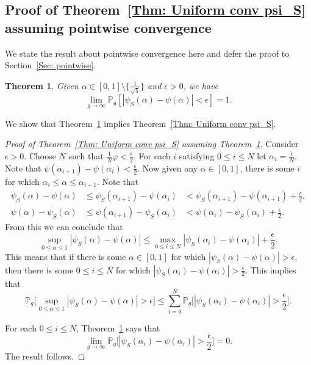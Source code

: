 \documentclass[12pt]{amsart}
\renewcommand{\phi}{\varphi}
\renewcommand{\P}{\mathbb{P}}
\newtheorem{theorem}{Theorem}
\begin{document}
\subsection{Proof of Theorem~\ref{Thm: Uniform conv psi_S} assuming pointwise convergence} 

We state the result about pointwise convergence here and defer the proof to Section~\ref{Sec: pointwise}.

\begin{theorem}\label{Thm: pointwise convergence}
Given $\alpha\in[0,1]\setminus\{\frac{1}{\sqrt{5}}\}$ and $\epsilon>0$, we have
\[\lim_{g\to\infty} \P_g[ |\psi_S(\alpha) -\psi(\alpha)|<\epsilon ] =1.\]
\end{theorem}

We show that Theorem~\ref{Thm: pointwise convergence} implies Theorem~\ref{Thm: Uniform conv psi_S}.

\begin{proof}[Proof of Theorem~\ref{Thm: Uniform conv psi_S} assuming Theorem~\ref{Thm: pointwise convergence}]
Consider $\epsilon>0$.
Choose $N$ such that $\frac{1}{N}\phi <\frac{\epsilon}{2}$. For each $i$ satisfying $0 \le i \le N$ let $\alpha_i=\frac{i}{N}$. Note that $\psi(\alpha_{i+1})-\psi(\alpha_i)<\frac{\epsilon}{2}$.
Now given any $\alpha\in [0,1]$, there is some $i$ for which $\alpha_i\leq \alpha\leq \alpha_{i+1}$. Note that
\begin{eqnarray*}
\psi_S(\alpha)-\psi(\alpha) & \leq \psi_S(\alpha_{i+1})-\psi(\alpha_i) & < \psi_S(\alpha_{i+1})-\psi(\alpha_{i+1}) +\frac{\epsilon}{2},\\
\psi(\alpha)-\psi_S(\alpha) & \leq \psi(\alpha_{i+1})-\psi_S(\alpha_i)  &< \psi(\alpha_{i})-\psi_S(\alpha_{i}) +\frac{\epsilon}{2}.
\end{eqnarray*}
From this we can conclude that
\[\sup_{0\leq \alpha\leq 1} |\psi_S(\alpha)-\psi(\alpha)| \leq \max_{0\leq i\leq N} |\psi_S(\alpha_i)- \psi(\alpha_i)| +\frac{\epsilon}{2}.\]
This means that if there is some $\alpha\in[0,1]$ for which $|\psi_S(\alpha)-\psi(\alpha)|>\epsilon$, then there is some $0\leq i\leq N$ for which $|\psi_S(\alpha_i)-\psi(\alpha_i)|>\frac{\epsilon}{2}$. This implies that
\[\P_g\Big[ \sup_{0\leq \alpha\leq 1}|\psi_S(\alpha) -\psi(\alpha)| >\epsilon \Big] \leq \sum_{i=0}^N \P_g\Big[ |\psi_S(\alpha_i) -\psi(\alpha_i)| >\frac{\epsilon}{2} \Big].\]

For each $0\leq i\leq N$, Theorem~\ref{Thm: pointwise convergence} says that
\[
\lim_{g\to\infty} \P_g\Big[ |\psi_S(\alpha_i) -\psi(\alpha_i)| >\frac{\epsilon}{2} \Big] = 0.
\]
The result follows.
\end{proof}
\end{document}
